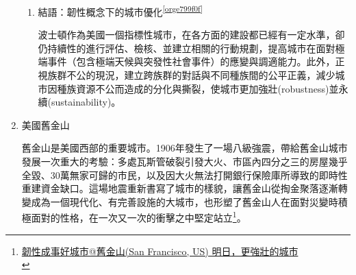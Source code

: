 \documentclass[a4paper,12pt]{article}
\begin{document}
\begin{enumerate}
\begin{enumerate}
\item 結語：韌性概念下的城市優化\textsuperscript{\ref{orge799f0f}}
\label{sec:orgcc80f94}

波士頓作為美國一個指標性城市，在各方面的建設都已經有一定水準，卻仍持續性的進行評估、檢核、並建立相關的行動規劃，提高城市在面對極端事件（包含極端天候與突發性社會事件）的應變與調適能力。此外，正視族群不公的現況，建立跨族群的對話與不同種族間的公平正義，減少城市因種族資源不公而造成的分化與撕裂，使城市更加強壯(robustness)並永續(sustainability)。\\
\end{enumerate}

\item 美國舊金山
\label{sec:org09f1464}

舊金山是美國西部的重要城市。1906年發生了一場八級強震，帶給舊金山城市發展一次重大的考驗：多處瓦斯管破裂引發大火、市區內四分之三的房屋幾乎全毀、30萬無家可歸的市民，以及因大火無法打開銀行保險庫所導致的即時性重建資金缺口。這場地震重新書寫了城市的樣貌，讓舊金山從掏金聚落逐漸轉變成為一個現代化、有完善設施的大城市，也形塑了舊金山人在面對災變時積極面對的性格，在一次又一次的衝擊之中堅定站立\footnote{\href{https://eyesonplace.net/2018/12/31/10103/}{韌性成事好城市@舊金山(San Francisco, US) 明日，更強壯的城市}\\\label{org4a734d2}}。\\


\end{enumerate}
\end{document}
